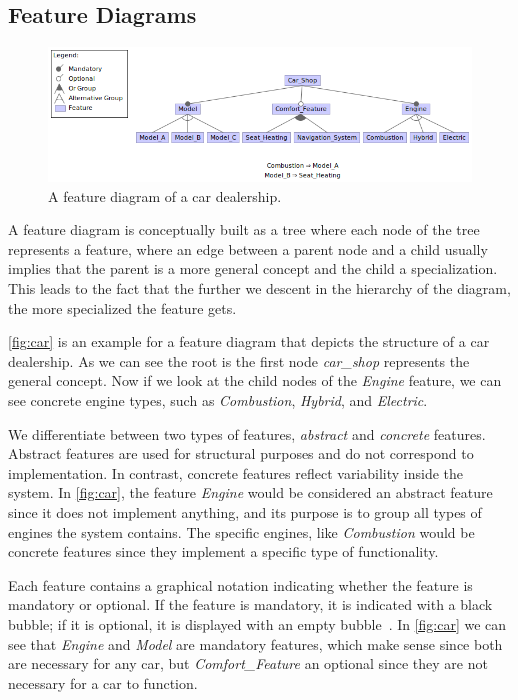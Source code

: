 \subsection{Feature Diagrams}\label{ch:feature-diagram}

\begin{figure}[h]
    \centering
    \includegraphics[scale=0.55]{gfx/Car_Shop.png}
    \caption{A feature diagram of a car dealership.}
    \label{fig:car}
\end{figure}

A feature diagram is conceptually built as a tree where each node of the tree represents a feature, 
where an edge between a parent node and a child usually implies that the parent is a more general concept and the child a specialization. 
This leads to the fact that the further we descent in the hierarchy of the diagram, the more specialized the feature gets.

\autoref{fig:car} is an example for a feature diagram that depicts the structure of a car dealership. As we can see the root
is the first node \textit{car\_shop} represents the general concept. Now if we look at the child nodes of the
\textit{Engine} feature, we can see concrete engine types, such as \textit{Combustion}, \textit{Hybrid}, and \textit{Electric}.

We differentiate between two types of features, \emph{abstract} and \emph{concrete} features. 
Abstract features are used for structural purposes and do not correspond to implementation. 
In contrast, concrete features reflect variability inside the system.
In \autoref{fig:car}, the feature \textit{Engine} would be considered an abstract feature since it does not implement anything, and its purpose
is to group all types of engines the system contains. The specific engines, like \textit{Combustion} would be concrete features since
they implement a specific type of functionality.

Each feature contains a graphical notation indicating whether the feature is mandatory or optional. 
If the feature is mandatory, it is indicated with a black bubble; if it is optional, it is displayed with an empty bubble~\cite{Feature-Oriented-Software-Product-Lines-Feature-models}. 
In \autoref{fig:car} we can see that \textit{Engine} and \textit{Model} are mandatory features, which make sense since both are necessary for any car, 
but \textit{Comfort\_Feature} an optional since they are not necessary for a car to function.

